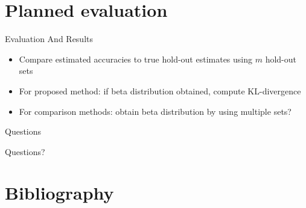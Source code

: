 \documentclass{beamer}
\begin{document}
\section{Planned evaluation}
\begin{frame}{Evaluation And Results}
	\begin{itemize}
		\item Compare estimated accuracies to true hold-out estimates using $m$ hold-out sets
		\item For proposed method: if beta distribution obtained, compute KL-divergence
		\item For comparison methods: obtain beta distribution by using multiple sets?
	\end{itemize}
\end{frame}

\begin{frame}{Questions}
	\begin{center}
		\huge{Questions?}
	\end{center}
\end{frame}

\section{Bibliography}
	
	
\end{document}
